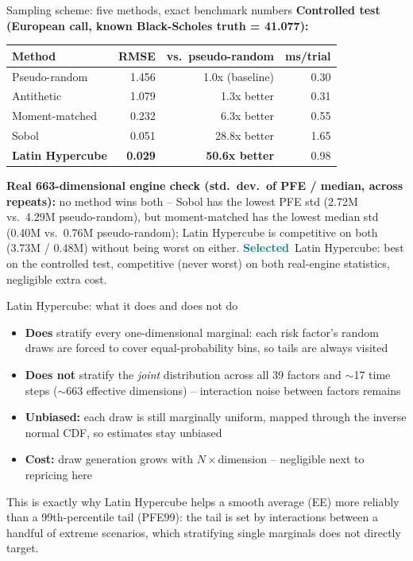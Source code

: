 \documentclass[8pt,aspectratio=169]{beamer}
\newcommand{\good}{\textcolor{teal}{\textbf{Selected}}}
\begin{document}
\begin{frame}{Sampling scheme: five methods, exact benchmark numbers}
  \small
  \textbf{Controlled test (European call, known Black-Scholes truth = 41.077):}
  \begin{tabular}{lrrr}
    \toprule
    \textbf{Method} & \textbf{RMSE} & \textbf{vs.\ pseudo-random} & \textbf{ms/trial} \\
    \midrule
    Pseudo-random & 1.456 & 1.0x (baseline) & 0.30 \\
    Antithetic & 1.079 & 1.3x better & 0.31 \\
    Moment-matched & 0.232 & 6.3x better & 0.55 \\
    Sobol & 0.051 & 28.8x better & 1.65 \\
    \textbf{Latin Hypercube} & \textbf{0.029} & \textbf{50.6x better} & 0.98 \\
    \bottomrule
  \end{tabular}
  \vspace{6pt}

  \textbf{Real 663-dimensional engine check (std.\ dev.\ of PFE / median, across repeats):} no method wins both -- Sobol has the lowest PFE std (2.72M vs.\ 4.29M pseudo-random), but moment-matched has the lowest median std (0.40M vs.\ 0.76M pseudo-random); Latin Hypercube is competitive on both (3.73M / 0.48M) without being worst on either.
  \vspace{4pt}
  \good\ Latin Hypercube: best on the controlled test, competitive (never worst) on both real-engine statistics, negligible extra cost.
\end{frame}

\begin{frame}{Latin Hypercube: what it does and does not do}
  \small
  \begin{itemize}
    \item \textbf{Does} stratify every one-dimensional marginal: each risk factor's random draws are forced to cover equal-probability bins, so tails are always visited
    \item \textbf{Does not} stratify the \emph{joint} distribution across all 39 factors and $\sim$17 time steps ($\sim$663 effective dimensions) -- interaction noise between factors remains
    \item \textbf{Unbiased:} each draw is still marginally uniform, mapped through the inverse normal CDF, so estimates stay unbiased
    \item \textbf{Cost:} draw generation grows with $N\times$dimension -- negligible next to repricing here
  \end{itemize}
  \vspace{6pt}
  This is exactly why Latin Hypercube helps a smooth average (EE) more reliably than a 99th-percentile tail (PFE99): the tail is set by interactions between a handful of extreme scenarios, which stratifying single marginals does not directly target.
\end{frame}
\end{document}
